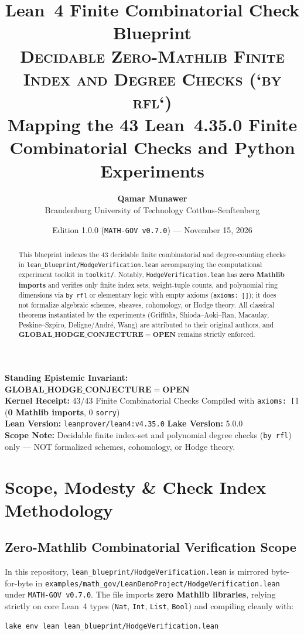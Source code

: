 \documentclass[11pt,a4paper]{article}
\title{\textbf{Lean~4 Finite Combinatorial Check Blueprint}\\[0.6ex]
\large \textsc{Decidable Zero-Mathlib Finite Index and Degree Checks (`by rfl`)}\\[0.3ex]
\normalsize Mapping the 43 Lean~4.35.0 Finite Combinatorial Checks and Python Experiments}
\author{\textbf{Qamar Munawer}\\[0.5ex]
\small Brandenburg University of Technology Cottbus-Senftenberg}
\date{Edition 1.0.0 (\texttt{MATH-GOV v0.7.0}) --- November 15, 2026}
\begin{document}
\maketitle

\begin{center}
\small
\textbf{Standing Epistemic Invariant:} $\mathbf{GLOBAL\_HODGE\_CONJECTURE = OPEN}$ \\
\textbf{Kernel Receipt:} $43/43$ Finite Combinatorial Checks Compiled with \texttt{axioms: []} (\textbf{0 Mathlib imports}, $0$ \texttt{sorry}) \\
\textbf{Lean Version:} \texttt{leanprover/lean4:v4.35.0} \quad \textbf{Lake Version:} 5.0.0 \\
\textbf{Scope Note:} Decidable finite index-set and polynomial degree checks (\texttt{by rfl}) only --- NOT formalized schemes, cohomology, or Hodge theory.
\end{center}

\vspace{1em}

\begin{abstract}
This blueprint indexes the $43$ decidable finite combinatorial and degree-counting checks in \texttt{lean\_blueprint/HodgeVerification.lean} accompanying the computational experiment toolkit in \texttt{toolkit/}. Notably, \texttt{HodgeVerification.lean} has \textbf{zero Mathlib imports} and verifies only finite index sets, weight-tuple counts, and polynomial ring dimensions via \texttt{by rfl} or elementary logic with empty axioms (\texttt{axioms: []}); it does not formalize algebraic schemes, sheaves, cohomology, or Hodge theory. All classical theorems instantiated by the experiments (Griffiths, Shioda--Aoki--Ran, Macaulay, Peskine--Szpiro, Deligne/Andr\'e, Wang) are attributed to their original authors, and $\mathbf{GLOBAL\_HODGE\_CONJECTURE = OPEN}$ remains strictly enforced.
\end{abstract}

\tableofcontents
\newpage

\section{Scope, Modesty \& Check Index Methodology}

\subsection{Zero-Mathlib Combinatorial Verification Scope}
In this repository, \texttt{lean\_blueprint/HodgeVerification.lean} is mirrored byte-for-byte in \texttt{examples/math\_gov/LeanDemoProject/HodgeVerification.lean} under \texttt{MATH-GOV v0.7.0}. The file imports \textbf{zero Mathlib libraries}, relying strictly on core Lean~4 types (\texttt{Nat}, \texttt{Int}, \texttt{List}, \texttt{Bool}) and compiling cleanly with:
\begin{lstlisting}[style=leancode]
lake env lean lean_blueprint/HodgeVerification.lean
\end{lstlisting}
\end{document}
